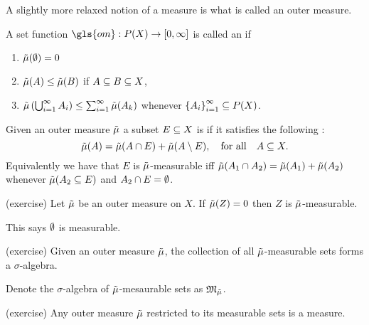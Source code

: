 A slightly more relaxed notion of a measure is what is called an outer measure.

\begin{defn}
  A set function $\gls{om}:P(X)\to [0,\infty]$ is called an  if
  \begin{enumerate}
    \item $\tilde{\mu}(\emptyset)=0$
    \item $\tilde{\mu}(A) \le \tilde{\mu}(B)$ if $A\subseteq B\subseteq X$,
    \item  $\tilde{\mu}\left( \bigcup_{i=1}^\infty A_i \right)\le
      \sum_{i=1}^\infty \tilde{\mu}(A_k)$ whenever $\left\{ A_i
      \right\}_{i=1}^\infty\subseteq P(X)$.
  \end{enumerate}
\end{defn}

\begin{defn}
  Given an outer measure $\tilde{\mu}$ a subset $E\subseteq X$ is
   if it satisfies the following
  :
  \begin{equation}
   \tilde{\mu}(A) = \tilde{\mu}(A\cap E)+\tilde{\mu}(A\setminus E), \quad\text{for all}\quad A\subseteq X.
  \end{equation}
  Equivalently we have that $E$ is $\tilde{\mu}$-measurable iff
  $\tilde{\mu}(A_1\cap A_2) = \tilde{\mu}(A_1)+\tilde{\mu}(A_2)$ whenever $\tilde{\mu}(A_2\subseteq E)$ and
  $A_2\cap E=\emptyset$.
\end{defn}

\begin{prop}(exercise)
  Let $\tilde{\mu}$ be an outer measure on $X$. If $\tilde{\mu}(Z) = 0$ then $Z$ is
  $\tilde{\mu}$-measurable.
\end{prop}

\begin{note}
  This says $\emptyset$ is measurable.
\end{note}

\begin{prop}
  (exercise) Given an outer measure $\tilde{\mu}$, the collection of all
  $\tilde{\mu}$-measurable sets forms a $\sigma$-algebra.
\end{prop}

\begin{defn}
  Denote the $\sigma$-algebra of $\tilde{\mu}$-mesaurable sets as
  $\mathfrak{M}_{\tilde{\mu}}$.
  
\end{defn}

\begin{prop}(exercise)
  Any outer measure $\tilde{\mu}$ restricted to its measurable sets is a
  measure.
\end{prop}

